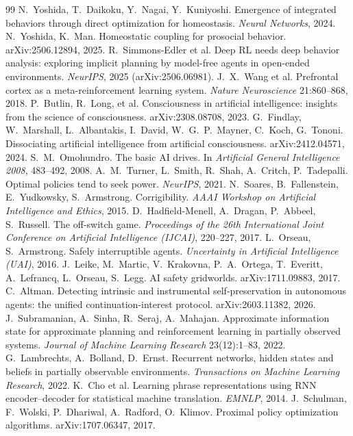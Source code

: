 \documentclass[11pt]{article}
\begin{document}
\begin{thebibliography}{99}
 N.~Yoshida, T.~Daikoku, Y.~Nagai, Y.~Kuniyoshi. Emergence of integrated behaviors through direct optimization for homeostasis. \emph{Neural Networks}, 2024.
 N.~Yoshida, K.~Man. Homeostatic coupling for prosocial behavior. arXiv:2506.12894, 2025.
 R.~Simmons-Edler et al. Deep RL needs deep behavior analysis: exploring implicit planning by model-free agents in open-ended environments. \emph{NeurIPS}, 2025 (arXiv:2506.06981).
 J.~X.~Wang et al. Prefrontal cortex as a meta-reinforcement learning system. \emph{Nature Neuroscience} 21:860--868, 2018.
 P.~Butlin, R.~Long, et al. Consciousness in artificial intelligence: insights from the science of consciousness. arXiv:2308.08708, 2023.
 G.~Findlay, W.~Marshall, L.~Albantakis, I.~David, W.~G.~P.~Mayner, C.~Koch, G.~Tononi. Dissociating artificial intelligence from artificial consciousness. arXiv:2412.04571, 2024.
 S.~M.~Omohundro. The basic AI drives. In \emph{Artificial General Intelligence 2008}, 483--492, 2008.
 A.~M.~Turner, L.~Smith, R.~Shah, A.~Critch, P.~Tadepalli. Optimal policies tend to seek power. \emph{NeurIPS}, 2021.
 N.~Soares, B.~Fallenstein, E.~Yudkowsky, S.~Armstrong. Corrigibility. \emph{AAAI Workshop on Artificial Intelligence and Ethics}, 2015.
 D.~Hadfield-Menell, A.~Dragan, P.~Abbeel, S.~Russell. The off-switch game. \emph{Proceedings of the 26th International Joint Conference on Artificial Intelligence (IJCAI)}, 220--227, 2017.
 L.~Orseau, S.~Armstrong. Safely interruptible agents. \emph{Uncertainty in Artificial Intelligence (UAI)}, 2016.
 J.~Leike, M.~Martic, V.~Krakovna, P.~A.~Ortega, T.~Everitt, A.~Lefrancq, L.~Orseau, S.~Legg. AI safety gridworlds. arXiv:1711.09883, 2017.
 C.~Altman. Detecting intrinsic and instrumental self-preservation in autonomous agents: the unified continuation-interest protocol. arXiv:2603.11382, 2026.
 J.~Subramanian, A.~Sinha, R.~Seraj, A.~Mahajan. Approximate information state for approximate planning and reinforcement learning in partially observed systems. \emph{Journal of Machine Learning Research} 23(12):1--83, 2022.
 G.~Lambrechts, A.~Bolland, D.~Ernst. Recurrent networks, hidden states and beliefs in partially observable environments. \emph{Transactions on Machine Learning Research}, 2022.
 K.~Cho et al. Learning phrase representations using RNN encoder--decoder for statistical machine translation. \emph{EMNLP}, 2014.
 J.~Schulman, F.~Wolski, P.~Dhariwal, A.~Radford, O.~Klimov. Proximal policy optimization algorithms. arXiv:1707.06347, 2017.
\end{thebibliography}
\end{document}
